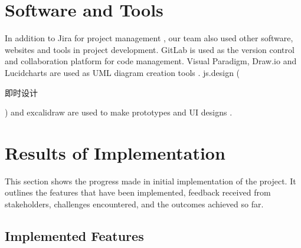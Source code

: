 \documentclass[a4paper,12pt, oneside]{report}
\begin{document}
\section{Software and Tools}
In addition to Jira for project management \citep{jira2024projectmanagement}, our team also used other software, websites and tools in project development. GitLab is used as the version control and collaboration platform for code management. Visual Paradigm, Draw.io and Lucidcharts are used as UML diagram creation tools \citep{drawio2024diagramming} \citep{lucidchart2024diagramming}. js.design (
\begin{CJK*}{UTF8}{gbsn}
即时设计
\end{CJK*}
) and excalidraw are used to make prototypes and UI designs \citep{jsdesign2024tool} \citep{excalidraw}.\\

\section{Results of Implementation}
This section shows the progress made in initial implementation of the project. It outlines the features that have been implemented, feedback received from stakeholders, challenges encountered, and the outcomes achieved so far.

\subsection{Implemented Features}
\label{subsec:implemented-features}
\end{document}

